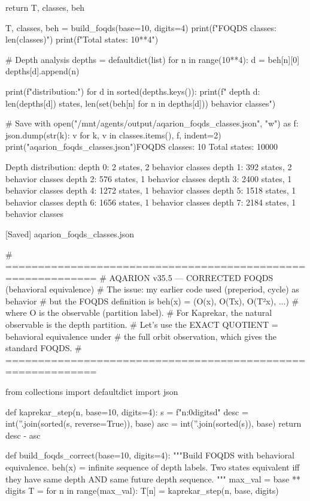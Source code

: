 {{{{{{{{{{{{{    return T, classes, beh

T, classes, beh = build_foqds(base=10, digits=4)
print(f"FOQDS classes: {len(classes)}")
print(f"Total states: {10**4}")

# Depth analysis
depths = defaultdict(list)
for n in range(10**4):
    d = beh[n][0]
    depths[d].append(n)

print(f"\nDepth distribution:")
for d in sorted(depths.keys()):
    print(f"  depth {d}: {len(depths[d])} states, {len(set(beh[n] for n in depths[d]))} behavior classes")

# Save
with open("/mnt/agents/output/aqarion_foqds_classes.json", "w") as f:
    json.dump({str(k): v for k, v in classes.items()}, f, indent=2)
print("\n[Saved] aqarion_foqds_classes.json")FOQDS classes: 10
Total states: 10000

Depth distribution:
  depth 0: 2 states, 2 behavior classes
  depth 1: 392 states, 2 behavior classes
  depth 2: 576 states, 1 behavior classes
  depth 3: 2400 states, 1 behavior classes
  depth 4: 1272 states, 1 behavior classes
  depth 5: 1518 states, 1 behavior classes
  depth 6: 1656 states, 1 behavior classes
  depth 7: 2184 states, 1 behavior classes

[Saved] aqarion_foqds_classes.json


# ============================================================
# AQARION v35.5 — CORRECTED FOQDS (behavioral equivalence)
# The issue: my earlier code used (preperiod, cycle) as behavior
# but the FOQDS definition is beh(x) = (O(x), O(Tx), O(T²x), ...)
# where O is the observable (partition label). 
# For Kaprekar, the natural observable is the depth partition.
# Let's use the EXACT QUOTIENT = behavioral equivalence under
# the full orbit observation, which gives the standard FOQDS.
# ============================================================

from collections import defaultdict
import json

def kaprekar_step(n, base=10, digits=4):
    s = f"{n:0{digits}d}"
    desc = int(''.join(sorted(s, reverse=True)), base)
    asc = int(''.join(sorted(s)), base)
    return desc - asc

def build_foqds_correct(base=10, digits=4):
    """Build FOQDS with behavioral equivalence.
    beh(x) = infinite sequence of depth labels.
    Two states equivalent iff they have same depth AND same future depth sequence.
    """
    max_val = base ** digits
    T = {}
    for n in range(max_val):
        T[n] = kaprekar_step(n, base, digits)
    
}}}}}}}}}}}}}
